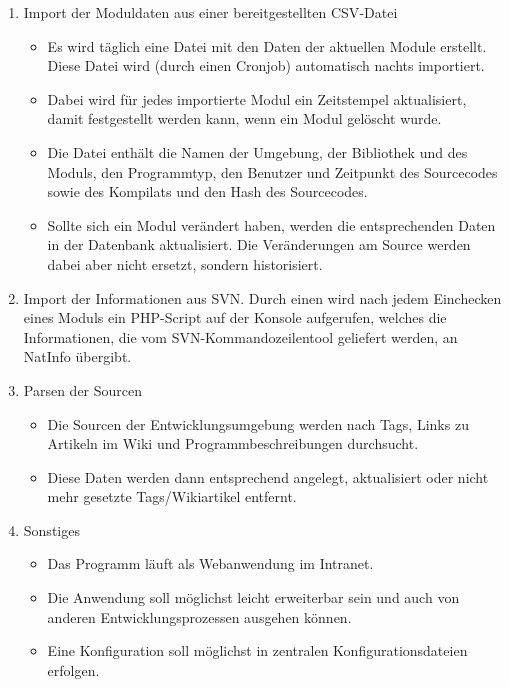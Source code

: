 \begin{enumerate}[itemsep=0em,partopsep=0em,parsep=0em,topsep=0em]
\begin{enumerate}
\begin{itemize}
		\end{itemize}
	\item Import der Moduldaten aus einer bereitgestellten \acs{CSV}-Datei
		\begin{itemize}
		\item Es wird täglich eine Datei mit den Daten der aktuellen Module erstellt. Diese Datei wird (durch einen Cronjob) automatisch nachts importiert.
		\item Dabei wird für jedes importierte Modul ein Zeitstempel aktualisiert, damit festgestellt werden kann, wenn ein Modul gelöscht wurde.
		\item Die Datei enthält die Namen der Umgebung, der Bibliothek und des Moduls, den Programmtyp, den Benutzer und Zeitpunkt des Sourcecodes sowie des Kompilats und den Hash des Sourcecodes.
		\item Sollte sich ein Modul verändert haben, werden die entsprechenden Daten in der Datenbank aktualisiert. Die Veränderungen am Source werden dabei aber nicht ersetzt, sondern historisiert.
		\end{itemize}
	\item Import der Informationen aus \ac{SVN}. Durch einen  wird nach jedem Einchecken eines Moduls ein \acs{PHP}-Script auf der Konsole aufgerufen, welches die Informationen, die vom \ac{SVN}-Kommandozeilentool geliefert werden, an \acs{NatInfo} übergibt.
	\item Parsen der Sourcen
		\begin{itemize}
		\item Die Sourcen der Entwicklungsumgebung werden nach Tags, Links zu Artikeln im Wiki und Programmbeschreibungen durchsucht.
		\item Diese Daten werden dann entsprechend angelegt, aktualisiert oder nicht mehr gesetzte Tags/Wikiartikel entfernt.
		\end{itemize}
	\item Sonstiges
		\begin{itemize}
		\item Das Programm läuft als Webanwendung im Intranet.
		\item Die Anwendung soll möglichst leicht erweiterbar sein und auch von anderen Entwicklungsprozessen ausgehen können.
		\item Eine Konfiguration soll möglichst in zentralen Konfigurationsdateien erfolgen.
		\end{itemize}
	\end{enumerate}
\end{enumerate}

